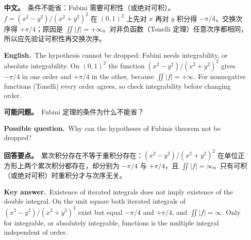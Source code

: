 \documentclass[UTF8,11pt,a4paper]{ctexart}
\newcommand{\BOTH}[2]{\par\noindent\textbf{中文。}\ #1\par\noindent\textbf{English.}\ #2\par}
\newcommand{\ASK}[4]{\begin{samepage}\par\noindent\textbf{可能问题。}\ #1\par\noindent\textbf{Possible question.}\ #2\par\noindent\textbf{回答要点。}\ #3\par\noindent\textbf{Key answer.}\ #4\medskip\end{samepage}}
\begin{document}
\BOTH{条件不能省：Fubini 需要可积性（或绝对可积）。$f=(x^2-y^2)/(x^2+y^2)^2$ 在 $(0,1)^2$ 上先对 $x$ 再对 $y$ 积分得 $-\pi/4$，交换次序得 $+\pi/4$；原因是 $\iint|f|=+\infty$。对非负函数（Tonelli 定理）任意次序都相同，所以应先验证可积性再交换次序。}{The hypothesis cannot be dropped: Fubini needs integrability, or absolute integrability. On $(0,1)^2$ the function $(x^2-y^2)/(x^2+y^2)^2$ gives $-\pi/4$ in one order and $+\pi/4$ in the other, because $\iint|f|=+\infty$. For nonnegative functions (Tonelli) every order agrees, so check integrability before changing order.}
\ASK{Fubini 定理的条件为什么不能省？}{Why can the hypotheses of Fubini\textquotesingle s theorem not be dropped?}{累次积分存在不等于重积分存在：$(x^2-y^2)/(x^2+y^2)^2$ 在单位正方形上两个累次积分都存在，却分别为 $-\pi/4$ 与 $+\pi/4$，且 $\iint|f|=\infty$。只有可积（或绝对可积）时重积分才与次序无关。}{Existence of iterated integrals does not imply existence of the double integral. On the unit square both iterated integrals of $(x^2-y^2)/(x^2+y^2)^2$ exist but equal $-\pi/4$ and $+\pi/4$, and $\iint|f|=\infty$. Only for integrable, or absolutely integrable, functions is the multiple integral independent of order.}
\end{document}
